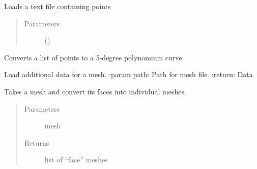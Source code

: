 \documentclass[letterpaper,10pt,english]{sphinxmanual}
\begin{document}

\begin{fulllineitems}
\label{\detokenize{lib:livestock.lib.geometry.load_points}}
Loads a text file containing points
\begin{quote}\begin{description}
\item[{Parameters}] \leavevmode
{} () \textendash{} 

\end{description}\end{quote}

\end{fulllineitems}


\begin{fulllineitems}
\label{\detokenize{lib:livestock.lib.geometry.make_curves_from_points}}
Converts a list of points to a 5-degree polynomium curve.

\end{fulllineitems}


\begin{fulllineitems}
\label{\detokenize{lib:livestock.lib.geometry.load_mesh_data}}
Load additional data for a mesh.
:param path: Path for mesh file.
:return: Data

\end{fulllineitems}


\begin{fulllineitems}
\label{\detokenize{lib:livestock.lib.geometry.get_mesh_faces}}
Takes a mesh and convert its faces into individual meshes.
\begin{quote}\begin{description}
\item[{Parameters}] \leavevmode
{} \textendash{} mesh

\item[{Returns}] \leavevmode
list of “face” meshes

\end{description}\end{quote}

\end{fulllineitems}
\end{document}
